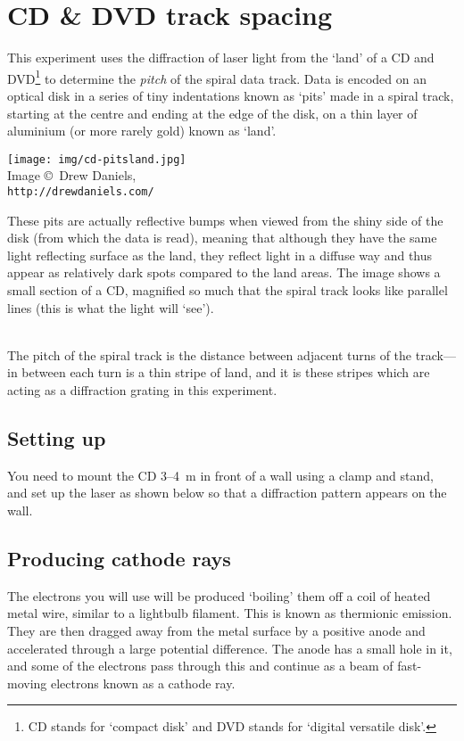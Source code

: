 \section{CD \& DVD track spacing}
\label{disktracks}

This experiment uses the diffraction of laser light from the `land' of a CD and DVD\footnote{CD stands for `compact disk' and DVD stands for `digital versatile disk'.} to determine the \emph{pitch} of the spiral data track.  Data is encoded on an optical disk in a series of tiny indentations known as `pits' made in a spiral track, starting at the centre and ending at the edge of the disk, on a thin layer of aluminium (or more rarely gold) known as `land'.  

\begin{minipage}{0.3\textwidth}\texttt{[image: img/cd-pitsland.jpg]}\\
{\footnotesize Image \copyright\ Drew Daniels,\\ \texttt{http://drewdaniels.com/}}\end{minipage}
\begin{minipage}{0.6\textwidth}
These pits are actually reflective bumps when viewed from the shiny side of the disk (from which the data is read), meaning that although they have the same light reflecting surface as the land, they reflect light in a diffuse way and thus appear as relatively dark spots compared to the land areas.  The image shows a small section of a CD, magnified so much that the spiral track looks like parallel lines (this is what the light will `see').
\end{minipage}\\

The pitch of the spiral track is the distance between adjacent turns of the track---in between each turn is a thin stripe of land, and it is these stripes which are acting as a diffraction grating in this experiment.

\subsection{Setting up}

You need to mount the CD 3--4~m in front of a wall using a clamp and stand, and set up the laser as shown below so that a diffraction pattern appears on the wall.


\subsection{Producing cathode rays}
The electrons you will use will be produced `boiling' them off a coil of heated metal wire, similar to a lightbulb filament.  This is known as thermionic emission.  They are then dragged away from the metal surface by a positive anode and accelerated through a large potential difference.  The anode has a small hole in it, and some of the electrons pass through this and continue as a beam of fast-moving electrons known as a cathode ray.

